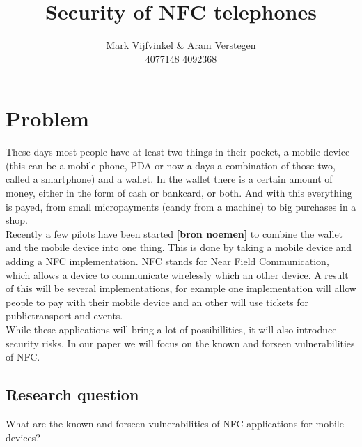 \documentclass[11pt]{article} %
\title{Security of NFC telephones}
\author{Mark Vijfvinkel \& Aram Verstegen \\ 4077148 4092368}
\date{} %
\begin{document}
\maketitle


\section{Problem}

These days most people have at least two things in their pocket, a mobile device (this can be a mobile phone, PDA or now a days a combination of those two, called a smartphone) and a wallet. In the wallet there is a certain amount of money, either in the form of cash or bankcard, or both. And with this everything is payed, from small micropayments (candy from a machine) to big purchases in a shop.
\\ Recently a few pilots have been started \textbf { [bron noemen]} to combine the wallet and the mobile device into one thing. This is done by taking a mobile device and adding a NFC implementation. NFC stands for Near Field Communication, which allows a device to communicate wirelessly which an other device. A result of this will be several implementations, for example one implementation will allow people to pay with their mobile device and an other will use tickets for publictransport and events. 
\\ While these applications will bring a lot of possibillities, it will also introduce security risks. In our paper we will focus on the known and forseen vulnerabilities of NFC.

\subsection{Research question}
\begin{center}

What are the known and forseen vulnerabilities of NFC applications for mobile devices? %
\end{center}
\end{document}
